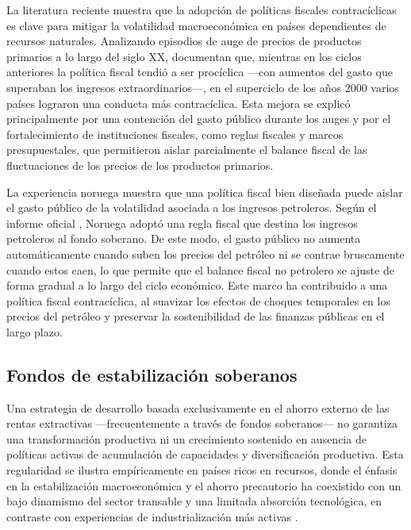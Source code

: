 \documentclass[../../PTFM.tex]{subfiles}
\begin{document}
	La literatura reciente muestra que la adopción de políticas fiscales contracíclicas es clave para mitigar la volatilidad macroeconómica en países dependientes de recursos naturales. Analizando episodios de auge de precios de productos primarios a lo largo del siglo XX, \textcite{Cspedes2014} documentan que, mientras en los ciclos anteriores la política fiscal tendió a ser procíclica —con aumentos del gasto que superaban los ingresos extraordinarios—, en el superciclo de los años 2000 varios países lograron una conducta más contracíclica. Esta mejora se explicó principalmente por una contención del gasto público durante los auges y por el fortalecimiento de instituciones fiscales, como reglas fiscales y marcos presupuestales, que permitieron aislar parcialmente el balance fiscal de las fluctuaciones de los precios de los productos primarios.
	
	La experiencia noruega muestra que una política fiscal bien diseñada puede aislar el gasto público de la volatilidad asociada a los ingresos petroleros. Según el informe oficial \textcite{NOU2015}, Noruega adoptó una regla fiscal que destina los ingresos petroleros al fondo soberano. De este modo, el gasto público no aumenta automáticamente cuando suben los precios del petróleo ni se contrae bruscamente cuando estos caen, lo que permite que el balance fiscal no petrolero se ajuste de forma gradual a lo largo del ciclo económico. Este marco ha contribuido a una política fiscal contracíclica, al suavizar los efectos de choques temporales en los precios del petróleo y preservar la sostenibilidad de las finanzas públicas en el largo plazo.
	
	\subsection{Fondos de estabilización soberanos}
	\label{subsec:fondos-soberanos}
	
	Una estrategia de desarrollo basada exclusivamente en el ahorro externo de las rentas extractivas —frecuentemente a través de fondos soberanos— no garantiza una transformación productiva ni un crecimiento sostenido en ausencia de políticas activas de acumulación de capacidades y diversificación productiva. Esta regularidad se ilustra empíricamente en países ricos en recursos, donde el énfasis en la estabilización macroeconómica y el ahorro precautorio ha coexistido con un bajo dinamismo del sector transable y una limitada absorción tecnológica, en contraste con experiencias de industrialización más activas \parencite{Cherif2013}.
	
\end{document}
